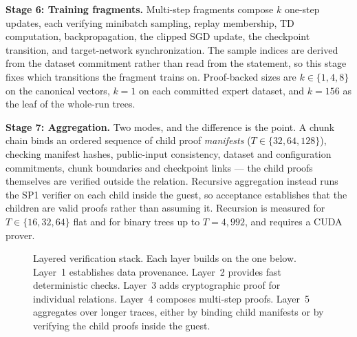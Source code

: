 \textbf{Stage 6: Training fragments.} Multi-step fragments compose $k$ one-step
updates, each verifying minibatch sampling, replay membership, TD computation,
backpropagation, the clipped SGD update, the checkpoint transition, and
target-network synchronization. The sample indices are derived from the dataset
commitment rather than read from the statement, so this stage fixes which
transitions the fragment trains on. Proof-backed sizes are $k \in \{1, 4, 8\}$
on the canonical vectors, $k = 1$ on each committed expert dataset, and
$k = 156$ as the leaf of the whole-run trees.

\textbf{Stage 7: Aggregation.} Two modes, and the difference is the point. A
chunk chain binds an ordered sequence of child proof \emph{manifests}
($T \in \{32, 64, 128\}$), checking manifest hashes, public-input consistency,
dataset and configuration commitments, chunk boundaries and checkpoint links ---
the child proofs themselves are verified outside the relation. Recursive
aggregation instead runs the SP1 verifier on each child inside the guest, so
acceptance establishes that the children are valid proofs rather than assuming
it. Recursion is measured for $T \in \{16, 32, 64\}$ flat and for binary trees
up to $T = 4{,}992$, and requires a CUDA prover.

\begin{figure}[!t]
\centering
{}
\caption{Layered verification stack. Each layer builds on the one below.
Layer~1 establishes data provenance. Layer~2 provides fast deterministic
checks. Layer~3 adds cryptographic proof for individual relations. Layer~4
composes multi-step proofs. Layer~5 aggregates over longer traces, either by
binding child manifests or by verifying the child proofs inside the guest.}
\label{fig:verification-stack}
\end{figure}

